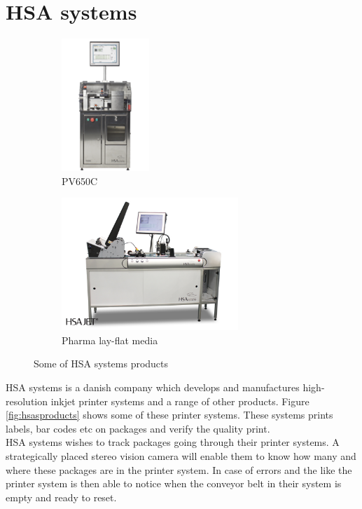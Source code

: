 \section{HSA systems}
\begin{figure}[ht!]
  \centering
  \begin{subfigure}[t]{0.45\textwidth}
    \centering\includegraphics[height=5cm]{figures/pv650_225px}
    \caption{PV650C\cite{HSAsystems}}
    \label{fig:pv650c}
  \end{subfigure}\hspace{0.5cm}
  \begin{subfigure}[t]{0.45\textwidth}
    \centering\includegraphics[height=5cm]{figures/layflat1_big}
    \caption{Pharma lay-flat media \cite{HSAsystems}\label{fig:layflat}}
  \end{subfigure}
  \caption{Some of HSA systems products\label{fig:hsasproducts}}
\end{figure}
HSA systems is a danish company which develops and manufactures high-resolution inkjet printer systems and a range of other products. Figure \vref{fig:hsasproducts} shows some of these printer systems. These systems prints labels, bar codes etc on packages and verify the quality print.\\

HSA systems wishes to track packages going through their printer systems. A strategically placed stereo vision camera will enable them to know how many and where these packages are in the printer system. In case of errors and the like the printer system is then able to notice when the conveyor belt in their system is empty and ready to reset.\\

